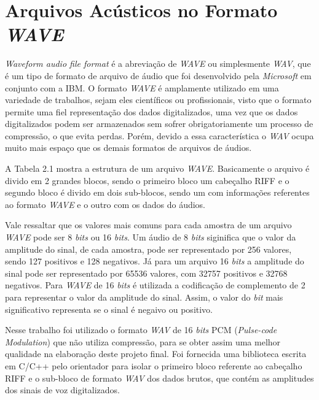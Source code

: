 \documentclass[a4paper,12pt,twoside,openright]{report}
\begin{document}
\section{Arquivos Ac\'{u}sticos no Formato \textit{WAVE}}
\label{secao_formato wave}

\par\textit{Waveform audio file format} \'{e} a abrevia\c{c}\~{a}o de \textit{WAVE} ou simplesmente \textit{WAV}, que \'{e} um tipo de formato de arquivo de \'{a}udio que foi desenvolvido pela \textit{Microsoft} em conjunto com a IBM. O formato \textit{WAVE} \'{e} amplamente utilizado em uma variedade de trabalhos, sejam eles cient\'{i}ficos ou profissionais, visto que o formato permite uma fiel representa\c{c}\~{a}o dos dados digitalizados, uma vez que os dados digitalizados podem ser armazenados sem sofrer obrigatoriamente um processo de compress\~{a}o, o que evita perdas. Por\'{e}m, devido a essa caracter\'{i}stica o \textit{WAV} ocupa muito mais espa\c{c}o que os demais formatos de arquivos de \'{a}udios. 

\par A Tabela 2.1 mostra a estrutura de um arquivo \textit{WAVE}. Basicamente o arquivo \'{e} divido em 2 grandes blocos, sendo o primeiro bloco um cabe{\c c}alho RIFF e o segundo bloco \'{e} divido em dois sub-blocos, sendo um com informa{\c c}\~{o}es referentes ao formato \textit{WAVE} e o outro com os dados do \'{a}udios.

\par Vale ressaltar que os valores mais comuns para cada amostra de um  arquivo \textit{WAVE} pode ser 8 \textit{bits} ou 16 \textit{bits}. Um \'{a}udio de 8 \textit{bits} siginifica que o valor da amplitude do sinal, de cada amostra, pode ser representado por 256 valores, sendo 127 positivos e 128 negativos. J\'{a} para um arquivo 16 \textit{bits} a amplitude do sinal pode ser representado por 65536 valores, com 32757 positivos e 32768 negativos. Para \textit{WAVE} de 16 \textit{bits} \'{e} utilizada a codifica{\c c}\~{a}o de complemento de 2 para representar o valor da amplitude do sinal. Assim, o valor do \textit{bit} mais significativo representa se o sinal \'{e} negaivo ou positivo.

\par Nesse trabalho foi utilizado o formato \textit{WAV} de 16 \textit{bits} PCM (\textit{Pulse-code Modulation}) que n\~{a}o utiliza compress\~{a}o, para se obter assim uma melhor qualidade na elabora\c{c}\~{a}o deste projeto final. Foi fornecida uma biblioteca escrita em C/C++ pelo orientador para isolar o primeiro bloco referente ao cabe{\c c}alho RIFF e o sub-bloco de formato \textit{WAV} dos dados brutos, que cont\'{e}m as amplitudes dos sinais de voz digitalizados.
\end{document}
